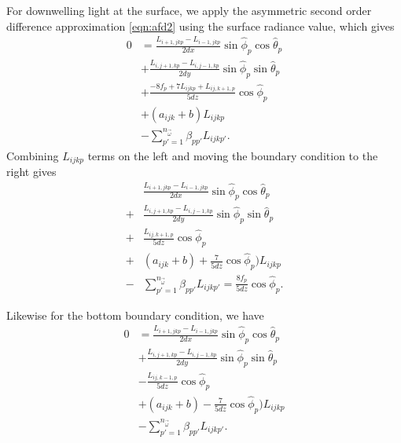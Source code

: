 For downwelling light at the surface, we apply the asymmetric second order difference approximation \eqref{eqn:afd2}
using the surface radiance value, which gives
\begin{equation*}
  \begin{aligned}
    0 &= \frac{L_{i+1,jkp}-L_{i-1,jkp}}{2dx}\sin\hat{\phi}_p\cos\hat{\theta}_p \\
    &+ \frac{L_{i,j+1,kp}-L_{i,j-1,kp}}{2dy}\sin\hat{\phi}_p\sin\hat{\theta}_p \\
    &+ \frac{-8f_p + 7L_{ijkp} + L_{ij,k+1,p}}{5dz}\cos\hat{\phi}_p \\
    &+ (a_{ijk}+b)L_{ijkp} \\
    &- \sum_{p'=1}^{n_{\vec{\omega}}} \beta_{pp'} L_{ijkp'}.
  \end{aligned}
\end{equation*}
Combining $L_{ijkp}$ terms on the left and moving the boundary condition to the
right gives
\begin{equation*}
  \begin{aligned}
    &\frac{L_{i+1,jkp}-L_{i-1,jkp}}{2dx}\sin\hat{\phi}_p\cos\hat{\theta}_p \\
    + &\frac{L_{i,j+1,kp}-L_{i,j-1,kp}}{2dy}\sin\hat{\phi}_p\sin\hat{\theta}_p \\
    + &\frac{L_{ij,k+1,p}}{5dz}\cos\hat{\phi}_p \\
    + &(a_{ijk}+b) + \frac{7}{5dz} \cos\hat{\phi}_p)L_{ijkp} \\
    - &\sum_{p'=1}^{n_{\vec{\omega}}} \beta_{pp'} L_{ijkp'} = \frac{8f_p}{5dz} \cos\hat{\phi}_p.
  \end{aligned}
\end{equation*}

Likewise for the bottom boundary condition, we have
\begin{equation*}
  \begin{aligned}
    0 &= \frac{L_{i+1,jkp}-L_{i-1,jkp}}{2dx}\sin\hat{\phi}_p\cos\hat{\theta}_p \\
    &+ \frac{L_{i,j+1,kp}-L_{i,j-1,kp}}{2dy}\sin\hat{\phi}_p\sin\hat{\theta}_p \\
    &- \frac{L_{ij,k-1,p}}{5dz}\cos\hat{\phi}_p \\
    &+ (a_{ijk}+b) - \frac{7}{5dz}\cos\hat{\phi}_p)L_{ijkp} \\
    &- \sum_{p'=1}^{n_{\vec{\omega}}} \beta_{pp'} L_{ijkp'}.
  \end{aligned}
\end{equation*}

